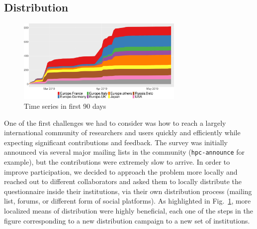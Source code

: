 \documentclass[preprint,5p,times]{elsarticle}
\begin{document}
\subsection*{Distribution}

\begin{figure}[tb]
  \begin{center}
    \includegraphics[width=8.0cm]{R-scripts/TimeSeries.pdf}
    \vspace{-1.5mm}
    \caption{Time series in first 90 days}
    \label{fig:time-series}
\vspace{-3mm}%
  \end{center}%
\end{figure}

One of the first challenges we had to consider was how to reach a largely
international community of researchers and users quickly and
efficiently while expecting significant contributions and feedback.
%
The survey was initially announced via several major mailing lists in the
community ({\tt hpc-announce} for example), but the contributions were
extremely slow to arrive. In order to improve participation, we decided to
approach the problem more locally and reached out to different collaborators and
asked them to locally distribute the questionnaire inside their institutions,
via their own distribution process (mailing list, forums, or different form of
social platforms). As highlighted in Fig.~\ref{fig:time-series}, more localized
means of distribution were highly beneficial, each one of the steps in the
figure corresponding to a new distribution campaign to a new set of
institutions.

\end{document}
